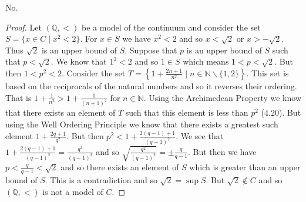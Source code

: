 \documentclass{article}
\begin{document}
\begin{flushleft}
No.
\begin{proof}
Let $(\mathbb{Q},<)$ be a model of the continuum and consider the set $S=\{x \in C \mid x^2 < 2\}$. For $x \in S$ we have $x^2 < 2$ and so $x < \sqrt{2}$ or $x > -\sqrt{2}$. Thus $\sqrt{2}$ is an upper bound of $S$. Suppose that $p$ is an upper bound of $S$ such that $p<\sqrt{2}$. We know that $1^2<2$ and so $1 \in S$ which means $1<p<\sqrt{2}$. But then $1<p^2<2$. Consider the set $T=\left\{1+\frac{2n+1}{n^2} \mid n \in \mathbb{N} \backslash \{1,2\} \right\}$. This set is based on the reciprocals of the natural numbers and so it reverses their ordering. That is $1+\frac{1}{n^2} > 1+ \frac{1}{(n+1)^2}$ for $n \in \mathbb{N}$. Using the Archimedean Property we know that there exists an element of $T$ such that this element is less than $p^2$ (4.20). But using the Well Ordering Principle we know that there exists a greatest such element $1+\frac{2q+1}{q^2}$. But then $p^2 < 1+\frac{2(q-1) +1}{(q-1)^2}$. We see that $1+\frac{2(q-1) +1}{(q-1)^2} = \frac{q^2}{(q-1)^2}$ and so $\sqrt{\frac{q^2}{(q-1)^2}}=\pm \frac{q}{q-1}$. But then we have $p<\frac{q}{q-1}<\sqrt{2}$ and so there exists an element of $S$ which is greater than an upper bound of $S$. This is a contradiction and so $\sqrt{2} = \sup S$. But $\sqrt{2} \notin C$ and so $(\mathbb{Q},<)$ is not a model of $C$.
\end{proof}

\end{flushleft}
\end{document}
